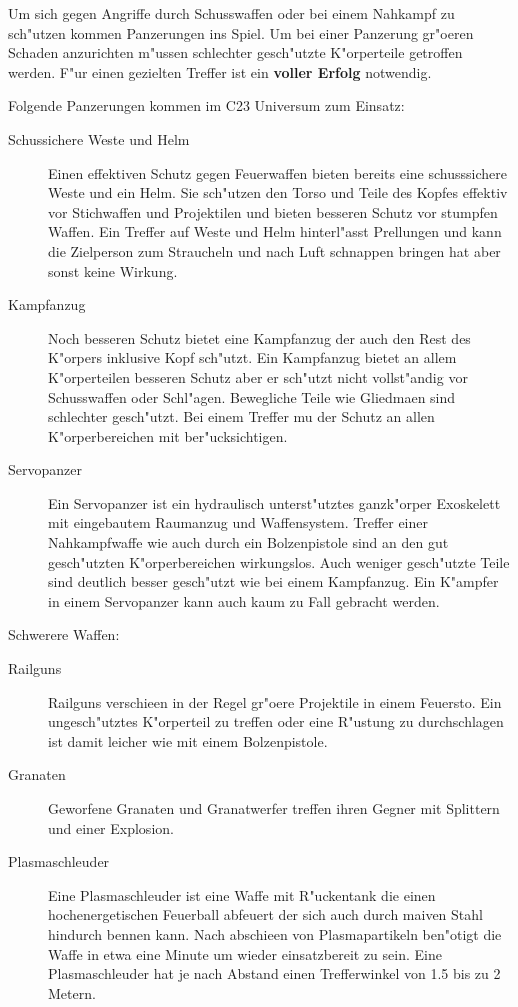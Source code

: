 Um sich gegen Angriffe durch Schusswaffen oder bei einem Nahkampf zu sch"utzen kommen Panzerungen ins Spiel. Um bei einer Panzerung gr"o\3eren Schaden anzurichten m"ussen schlechter gesch"utzte K"orperteile getroffen werden. F"ur einen gezielten Treffer ist ein \textbf{voller Erfolg} notwendig.

Folgende Panzerungen kommen im C23 Universum zum Einsatz:

\begin{description}
    \item[Schussichere Weste und Helm] Einen effektiven Schutz gegen Feuerwaffen bieten bereits eine schusssichere Weste und ein Helm. Sie 
        sch"utzen den Torso und Teile des Kopfes effektiv vor Stichwaffen und Projektilen und bieten besseren Schutz vor stumpfen Waffen. Ein Treffer auf Weste und Helm hinterl"asst Prellungen und kann die Zielperson zum Straucheln und nach Luft schnappen bringen hat aber sonst keine Wirkung.
    \item[Kampfanzug] Noch besseren Schutz bietet eine Kampfanzug der auch den Rest des K"orpers inklusive Kopf sch"utzt. Ein Kampfanzug 
        bietet an allem K"orperteilen besseren Schutz aber er sch"utzt nicht vollst"andig vor Schusswaffen oder Schl"agen. Bewegliche Teile wie Gliedma\3en sind schlechter gesch"utzt. Bei einem Treffer mu\3 der Schutz an allen K"orperbereichen mit ber"ucksichtigen.
    \item[Servopanzer] Ein Servopanzer ist ein hydraulisch unterst"utztes ganzk"orper Exoskelett mit eingebautem Raumanzug und 
        Waffensystem. Treffer einer Nahkampfwaffe wie auch durch ein Bolzenpistole sind an den gut gesch"utzten K"orperbereichen wirkungslos. Auch weniger gesch"utzte Teile sind deutlich besser gesch"utzt wie bei einem Kampfanzug. Ein K"ampfer in einem Servopanzer kann auch kaum zu Fall gebracht werden.
\end{description}

Schwerere Waffen:

\begin{description}
    \item[Railguns] Railguns verschie\3en in der Regel gr"o\3ere Projektile in einem Feuersto\3. Ein ungesch"utztes K"orperteil zu treffen 
        oder eine R"ustung zu durchschlagen ist damit leicher wie mit einem Bolzenpistole.
    \item[Granaten] Geworfene Granaten und Granatwerfer treffen ihren Gegner mit Splittern und einer Explosion.
    \item[Plasmaschleuder] Eine Plasmaschleuder ist eine Waffe mit R"uckentank die einen hochenergetischen Feuerball abfeuert der sich auch 
        durch ma\3iven Stahl hindurch bennen kann. Nach abschie\3en von Plasmapartikeln ben"otigt die Waffe in etwa eine Minute um wieder einsatzbereit zu sein. Eine Plasmaschleuder hat je nach Abstand einen Trefferwinkel von 1.5 bis zu 2 Metern.
\end{description}


